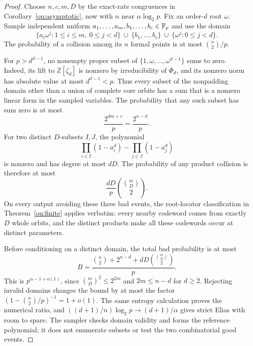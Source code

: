 \begin{proof}
Choose $n,c,m,D$ by the exact-rate congruences in
Corollary~\ref{ou:asymptotic}, now with $n$ near $\alpha\log_2p$.
Fix an order-$d$ root $\omega$. Sample independent uniform
$a_1,\ldots,a_m,b_1,\ldots,b_c\in\mathbb F_p$ and use the domain
\[
 \{a_i\omega^j:1\le i\le m,\ 0\le j<d\}
 \ \cup\ \{b_1,\ldots,b_c\}
 \ \cup\ \{\omega^j:0\le j<d\}.
\]
The probability of a collision among its $n$ formal points is at most
$\binom n2/p$.

For $p>d^{d-1}$, no nonempty proper subset of
$\{1,\omega,\ldots,\omega^{d-1}\}$ sums to zero. Indeed, its lift to
$\mathbb Z[\zeta_d]$ is nonzero by irreducibility of $\Phi_d$, and
its nonzero norm has absolute value at most $d^{d-1}<p$.
Thus every subset of the nonpadding domain other than a union of
complete core orbits has a sum that is a nonzero linear form in the
sampled variables. The probability that any such subset has sum zero
is at most
\[
 \frac{2^{dm+c}}p=\frac{2^{n-d}}p.
\]
For two distinct $D$-subsets $I,J$, the polynomial
\[
 \prod_{i\in I}(1-a_i^d)-\prod_{j\in J}(1-a_j^d)
\]
is nonzero and has degree at most $dD$. The probability of any product
collision is therefore at most
\[
 \frac{dD}{p}\binom{\binom mD}{2}.
\]
On every output avoiding these three bad events, the root-locator
classification in Theorem~\ref{ou:finite} applies verbatim: every
nearby codeword comes from exactly $D$ whole orbits, and the distinct
products make all these codewords occur at distinct parameters.

Before conditioning on a distinct domain, the total bad probability
is at most
\begin{equation}\label{eq:ou-random-failure}
 B=\frac{\binom n2+2^{n-d}+dD\binom{\binom mD}{2}}p.
\end{equation}
This is $p^{\alpha-1+o(1)}$, since
$\binom mD^2\le 2^{2m}$ and $2m\le n-d$ for $d\ge2$.
Rejecting invalid domains changes the bound by at most the factor
$(1-\binom n2/p)^{-1}=1+o(1)$.
The same entropy calculation proves the numerical ratio, and
$((d+1)/n)\log_2p\to(d+1)/\alpha$ gives strict Elias with room to spare.
The sampler checks domain validity and forms the reference polynomial;
it does not enumerate subsets or test the two combinatorial good events.
\end{proof}

